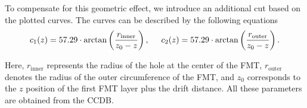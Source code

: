     To compensate for this geometric effect, we introduce an additional cut based on the plotted curves.
    The curves can be described by the following equations
    \begin{equation}
        c_1(z) = 57.29 \cdot \arctan\left(\frac{r_\text{inner}}{z_0 - z}\right),
        \hspace{0.5cm}
        c_2(z) = 57.29 \cdot \arctan\left(\frac{r_\text{outer}}{z_0 - z}\right).
        \label{eq::12.42::fmt_geometry_cut}
    \end{equation}

    Here, $r_\text{inner}$ represents the radius of the hole at the center of the FMT, $r_\text{outer}$ denotes the radius of the outer circumference of the FMT, and $z_0$ corresponds to the $z$ position of the first FMT layer plus the drift distance.
    All these parameters are obtained from the CCDB.
